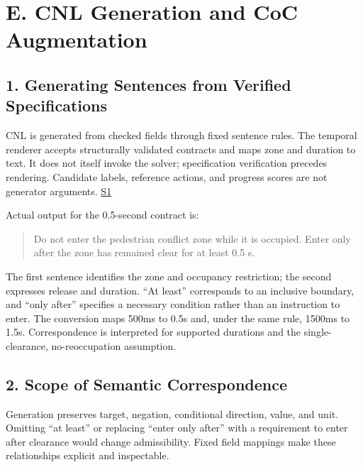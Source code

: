 \documentclass[11pt,a4paper]{article}
\begin{document}
\section*{E. CNL Generation and CoC Augmentation}

\subsection*{1. Generating Sentences from Verified Specifications}

CNL is generated from checked fields through fixed sentence rules. The temporal renderer accepts structurally validated contracts and maps zone and duration to text. It does not itself invoke the solver; specification verification precedes rendering. Candidate labels, reference actions, and progress scores are not generator arguments. \href{\detokenize{../../../../../../projects/04-guardsynth-coc/experiments/paper1_cnl_learning/temporal_preservation.py}}{S1}\par

Actual output for the 0.5-second contract is:\par

\begin{quote}Do not enter the pedestrian conflict zone while it is occupied. Enter only after the zone has remained clear for at least 0.5 s.\end{quote}

The first sentence identifies the zone and occupancy restriction; the second expresses release and duration. “At least” corresponds to an inclusive boundary, and “only after” specifies a necessary condition rather than an instruction to enter. The conversion maps 500ms to 0.5s and, under the same rule, 1500ms to 1.5s. Correspondence is interpreted for supported durations and the single-clearance, no-reoccupation assumption.\par

\subsection*{2. Scope of Semantic Correspondence}

Generation preserves target, negation, conditional direction, value, and unit. Omitting “at least” or replacing “enter only after” with a requirement to enter after clearance would change admissibility. Fixed field mappings make these relationships explicit and inspectable.\par
\end{document}
